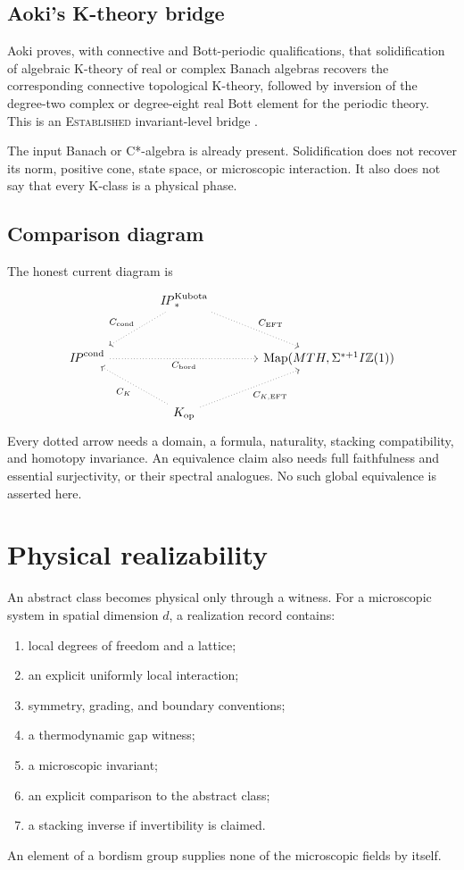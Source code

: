 \documentclass[12pt]{article}
\theoremstyle{definition}
\theoremstyle{remark}
\newcommand{\Map}{\operatorname{Map}}
\newcommand{\IP}{\mathit{IP}}
\newcommand{\Kop}{K_{\mathrm{op}}}
\newcommand{\EST}{\textnormal{\textsc{Established}}}
\begin{document}
\subsection{Aoki's K-theory bridge}

Aoki proves, with connective and Bott-periodic qualifications, that
solidification of algebraic K-theory of real or complex Banach algebras
recovers the corresponding connective topological K-theory, followed by
inversion of the degree-two complex or degree-eight real Bott element for
the periodic theory.  This is an \EST{} invariant-level bridge
\cite{Aoki2024}.

The input Banach or C*-algebra is already present.  Solidification does not
recover its norm, positive cone, state space, or microscopic interaction.
It also does not say that every K-class is a physical phase.

\subsection{Comparison diagram}

The honest current diagram is
\begin{equation}
\begin{tikzcd}[column sep=large,row sep=large]
& \IP_*^{\mathrm{Kubota}}
  \arrow[dl,dotted,"C_{\mathrm{cond}}"']
  \arrow[dr,dotted,"C_{\mathrm{EFT}}"] & \\
\IP^{\mathrm{cond}}
  \arrow[rr,dotted,"C_{\mathrm{bord}}"']
&& \Map(MTH,\Sigma^{*+1}I\mathbb Z(1)) \\
& \Kop
  \arrow[ul,dotted,"C_K"]
  \arrow[ur,dotted,"C_{K,\mathrm{EFT}}"'] &
\end{tikzcd}
\label{eq:comparison-web}
\end{equation}
Every dotted arrow needs a domain, a formula, naturality, stacking
compatibility, and homotopy invariance.  An equivalence claim also needs
full faithfulness and essential surjectivity, or their spectral analogues.
No such global equivalence is asserted here.

\section{Physical realizability}

An abstract class becomes physical only through a witness.  For a
microscopic system in spatial dimension $d$, a realization record contains:
\begin{enumerate}[leftmargin=2.2em]
  \item local degrees of freedom and a lattice;
  \item an explicit uniformly local interaction;
  \item symmetry, grading, and boundary conventions;
  \item a thermodynamic gap witness;
  \item a microscopic invariant;
  \item an explicit comparison to the abstract class;
  \item a stacking inverse if invertibility is claimed.
\end{enumerate}
An element of a bordism group supplies none of the microscopic fields by
itself.
\end{document}

